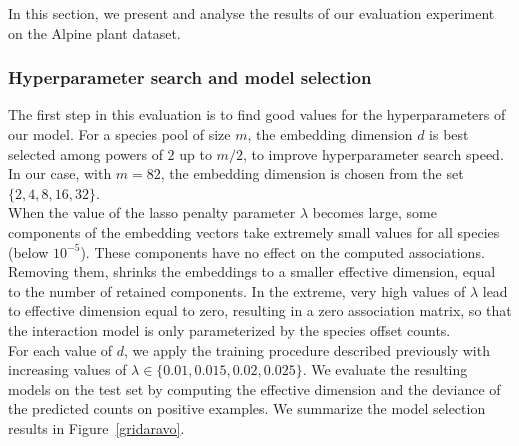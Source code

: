 \documentclass[10pt,a4paper]{article}
\begin{document}
In this section, we present and analyse the results of our evaluation experiment on the Alpine plant dataset.

\subsubsection{Hyperparameter search and model selection}
The first step in this evaluation is to find good values for the hyperparameters of our model. For a species pool of size $m$, the embedding dimension $d$ is best selected among powers of $2$ up to $m/2$, to improve hyperparameter search speed. In our case, with $m=82$, the embedding dimension is chosen from the set $\{2,4,8,16,32\}$. \\

When the value of the lasso penalty parameter $\lambda$ becomes large, some components of the embedding vectors take extremely small values for all species (below $10^{-5}$). These components have no effect on the computed associations. Removing them, shrinks the embeddings to a smaller effective dimension, equal to the number of retained components. In the extreme, very high values of $\lambda$ lead to effective dimension equal to zero, resulting in a zero association matrix, so that the interaction model is only parameterized by the species offset counts.\\

For each value of $d$, we apply the training procedure described previously with increasing values of $\lambda \in \{0.01,0.015,0.02,0.025\}$. We evaluate the resulting models on the test set by computing the effective dimension and the deviance of the predicted counts on positive examples. We summarize the model selection results in Figure~\ref{gridaravo}.\\
\end{document}
